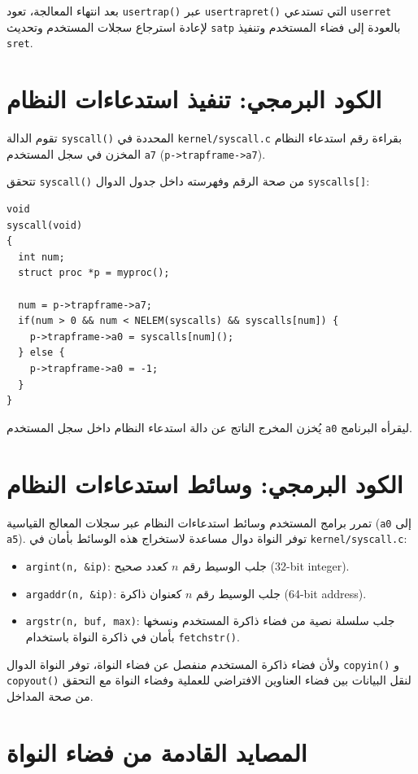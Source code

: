 بعد انتهاء المعالجة، تعود \texttt{usertrap()} عبر \texttt{usertrapret()} التي تستدعي \texttt{userret} لإعادة استرجاع سجلات المستخدم وتحديث \texttt{satp} بالعودة إلى فضاء المستخدم وتنفيذ \texttt{sret}.

\section{الكود البرمجي: تنفيذ استدعاءات النظام}
\label{sec:code_calling_syscalls}

تقوم الدالة \texttt{syscall()} المحددة في \texttt{kernel/syscall.c} بقراءة رقم استدعاء النظام المخزن في سجل المستخدم \texttt{a7} (\texttt{p->trapframe->a7}).

تتحقق \texttt{syscall()} من صحة الرقم وفهرسته داخل جدول الدوال \texttt{syscalls[]}:
\begin{lstlisting}
void
syscall(void)
{
  int num;
  struct proc *p = myproc();

  num = p->trapframe->a7;
  if(num > 0 && num < NELEM(syscalls) && syscalls[num]) {
    p->trapframe->a0 = syscalls[num]();
  } else {
    p->trapframe->a0 = -1;
  }
}
\end{lstlisting}
يُخزن المخرج الناتج عن دالة استدعاء النظام داخل سجل المستخدم \texttt{a0} ليقرأه البرنامج.

\section{الكود البرمجي: وسائط استدعاءات النظام}
\label{sec:code_syscall_args}

تمرر برامج المستخدم وسائط استدعاءات النظام عبر سجلات المعالج القياسية (\texttt{a0} إلى \texttt{a5}).
توفر النواة دوال مساعدة لاستخراج هذه الوسائط بأمان في \texttt{kernel/syscall.c}:
\begin{itemize}
  \item \texttt{argint(n, \&ip)}: جلب الوسيط رقم $n$ كعدد صحيح (32-bit integer).
  \item \texttt{argaddr(n, \&ip)}: جلب الوسيط رقم $n$ كعنوان ذاكرة (64-bit address).
  \item \texttt{argstr(n, buf, max)}: جلب سلسلة نصية من فضاء ذاكرة المستخدم ونسخها بأمان في ذاكرة النواة باستخدام \texttt{fetchstr()}.
\end{itemize}

ولأن فضاء ذاكرة المستخدم منفصل عن فضاء النواة، توفر النواة الدوال \texttt{copyin()} و \texttt{copyout()} لنقل البيانات بين فضاء العناوين الافتراضي للعملية وفضاء النواة مع التحقق من صحة المداخل.

\section{المصايد القادمة من فضاء النواة}
\label{sec:traps_kernel_space}

